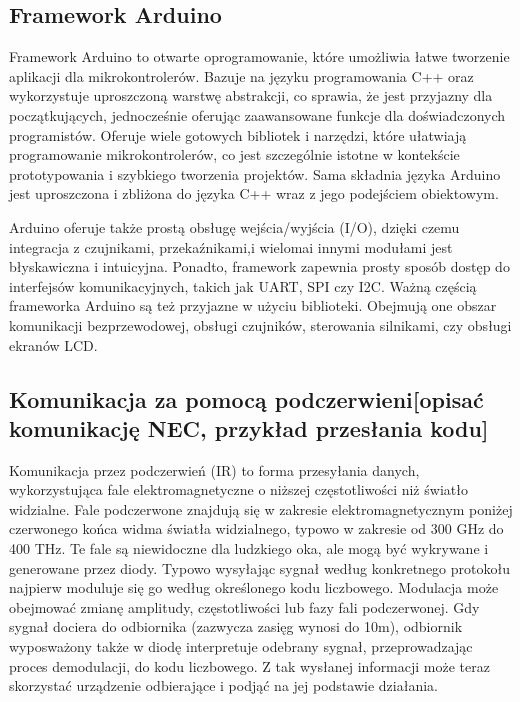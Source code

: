 \documentclass[12pt,twoside,draft]{article}
\begin{document}
\subsection{Framework Arduino}
{Framework Arduino to otwarte oprogramowanie, które umożliwia łatwe tworzenie aplikacji dla mikrokontrolerów. 
Bazuje na języku programowania C++ oraz wykorzystuje uproszczoną warstwę abstrakcji, co sprawia, że 
jest przyjazny dla początkujących, jednocześnie oferując zaawansowane funkcje dla doświadczonych programistów.
Oferuje wiele gotowych bibliotek i narzędzi, które ułatwiają programowanie mikrokontrolerów, 
co jest szczególnie istotne w kontekście prototypowania i szybkiego tworzenia projektów.
Sama składnia języka Arduino jest uproszczona i zbliżona do języka C++ wraz z jego podejściem obiektowym.

Arduino oferuje także prostą obsługę wejścia/wyjścia (I/O), dzięki czemu integracja z czujnikami, przekaźnikami,i wielomai 
innymi modułami jest błyskawiczna i intuicyjna. Ponadto, framework zapewnia prosty sposób dostęp do interfejsów komunikacyjnych,
 takich jak UART, SPI czy I2C. Ważną częścią frameworka Arduino są też przyjazne w użyciu biblioteki. Obejmują one obszar komunikacji 
 bezprzewodowej, obsługi czujników, sterowania silnikami, czy obsługi ekranów LCD.}
\subsection{Komunikacja za pomocą podczerwieni[opisać komunikację NEC, przykład przesłania kodu]}
{Komunikacja przez podczerwień (IR) to forma przesyłania danych, wykorzystująca fale elektromagnetyczne
 o niższej częstotliwości niż światło widzialne. Fale podczerwone znajdują się w zakresie elektromagnetycznym 
 poniżej czerwonego końca widma światła widzialnego, typowo w zakresie od 300 GHz do 400 THz. Te fale są 
 niewidoczne dla ludzkiego oka, ale mogą być wykrywane i generowane przez diody. Typowo 
 wysyłając sygnał według konkretnego protokołu najpierw moduluje się go według określonego kodu liczbowego.
Modulacja może obejmować zmianę amplitudy, częstotliwości lub fazy fali podczerwonej. Gdy sygnał dociera do odbiornika 
(zazwycza zasięg wynosi do 10m), odbiornik wyposważony także w diodę interpretuje odebrany sygnał, przeprowadzając proces demodulacji, do kodu 
liczbowego. Z tak wysłanej informacji może teraz skorzystać urządzenie odbierające i podjąć na jej podstawie działania.}
\end{document}
